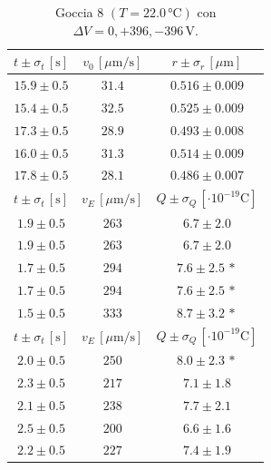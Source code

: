 \documentclass[]{article}
\begin{document}
    \begin{table}[H]
        \centering
        \begin{tabular}{||c|c|c||}
            \hline
            $t \pm \sigma_t \, \left[\text{s}\right]$ & $v_0 \, \left[\mu\text{m/s}\right]$ & $r \pm \sigma_r \, \left[\mu\text{m}\right]$ \\\hline
            \hline
            $15.9 \pm 0.5$ & $31.4$ & $0.516 \pm 0.009$ \\\hline
            $15.4 \pm 0.5$ & $32.5$ & $0.525 \pm 0.009$ \\\hline
            $17.3 \pm 0.5$ & $28.9$ & $0.493 \pm 0.008$ \\\hline
            $16.0 \pm 0.5$ & $31.3$ & $0.514 \pm 0.009$ \\\hline
            $17.8 \pm 0.5$ & $28.1$ & $0.486 \pm 0.007$ \\\hline
            \hline
            $t \pm \sigma_t \, \left[\text{s}\right]$ & $v_E \, \left[\mu\text{m/s}\right]$ & $Q \pm \sigma_Q \, \left[\cdot 10^{-19} \text{C}\right]$ \\\hline
            \hline
            $1.9 \pm 0.5$ & $263$ & $6.7 \pm 2.0$ \\\hline
            $1.9 \pm 0.5$ & $263$ & $6.7 \pm 2.0$ \\\hline
            $1.7 \pm 0.5$ & $294$ & $7.6 \pm 2.5\,\ast$ \\\hline
            $1.7 \pm 0.5$ & $294$ & $7.6 \pm 2.5\,\ast$ \\\hline
            $1.5 \pm 0.5$ & $333$ & $8.7 \pm 3.2\,\ast$ \\\hline
            \hline
            $t \pm \sigma_t \, \left[\text{s}\right]$ & $v_E \, \left[\mu\text{m/s}\right]$ & $Q \pm \sigma_Q \, \left[\cdot 10^{-19} \text{C}\right]$ \\\hline
            \hline
            $2.0 \pm 0.5$ & $250$ & $8.0 \pm 2.3\,\ast$ \\\hline
            $2.3 \pm 0.5$ & $217$ & $7.1 \pm 1.8$ \\\hline
            $2.1 \pm 0.5$ & $238$ & $7.7 \pm 2.1$ \\\hline
            $2.5 \pm 0.5$ & $200$ & $6.6 \pm 1.6$ \\\hline
            $2.2 \pm 0.5$ & $227$ & $7.4 \pm 1.9$ \\\hline
        \end{tabular}
        \caption{Goccia 8 $\left(T = 22.0\, \text{°C}\right)$ con $\Delta V = 0,+396,-396 \,\text{V}$.}
        \label{goccia-8}
    \end{table}
\end{document}
